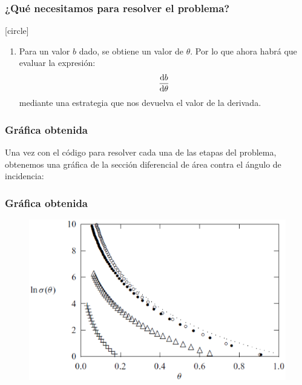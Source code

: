 \begin{frame}
\frametitle{¿Qué necesitamos para resolver el problema?}
[circle]
\begin{enumerate}
\conti
\item Para un valor $b$ dado, se obtiene un valor de $\theta$. Por lo que ahora habrá que evaluar la expresión:
\begin{align*}
\dv{b}{\theta}
\end{align*}
mediante una estrategia que nos devuelva el valor de la derivada.
\end{enumerate}
\end{frame}
\begin{frame}
\frametitle{Gráfica obtenida}
Una vez con el código para resolver cada una de las etapas del problema, obtenemos una gráfica de la sección diferencial de área contra el ángulo de incidencia:
\end{frame}
\begin{frame}
\frametitle{Gráfica obtenida}
\begin{figure}
\centering
\includegraphics[scale=0.4]{Imagenes/graficadispersion_01.eps} 
\end{figure}
\end{frame}
